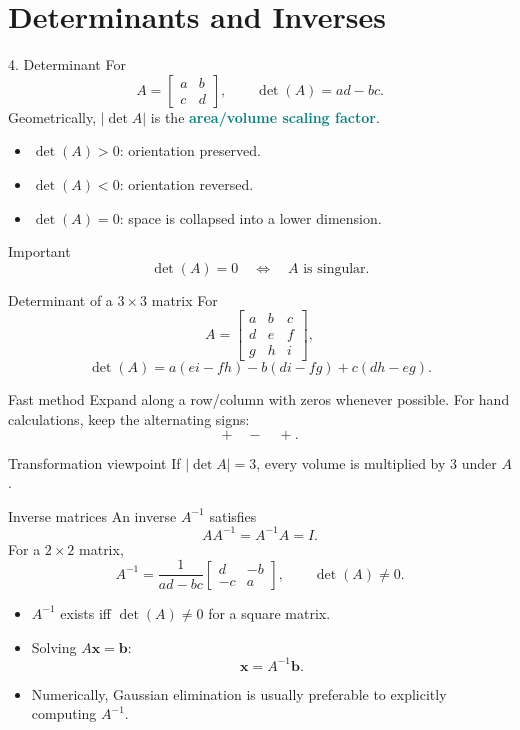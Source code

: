 \documentclass[aspectratio=169,11pt]{beamer}
\newcommand{\vect}[1]{\bm{#1}}
\newcommand{\important}[1]{\textcolor{teal}{\textbf{#1}}}
\begin{document}
\section{Determinants and Inverses}
\begin{frame}{4. Determinant}
For
\[
A=\begin{bmatrix}a&b\\c&d\end{bmatrix},
\qquad
\det(A)=ad-bc.
\]
Geometrically, $|\det A|$ is the \important{area/volume scaling factor}.
\begin{itemize}
\item $\det(A)>0$: orientation preserved.
\item $\det(A)<0$: orientation reversed.
\item $\det(A)=0$: space is collapsed into a lower dimension.
\end{itemize}
\begin{alertblock}{Important}
\[
\det(A)=0\quad\Longleftrightarrow\quad A\text{ is singular}.
\]
\end{alertblock}
\end{frame}

\begin{frame}{Determinant of a $3\times3$ matrix}
For
\[
A=
\begin{bmatrix}
a&b&c\\d&e&f\\g&h&i
\end{bmatrix},
\]
\[
\det(A)=
a(ei-fh)-b(di-fg)+c(dh-eg).
\]
\begin{exampleblock}{Fast method}
Expand along a row/column with zeros whenever possible. For hand calculations, keep the alternating signs:
\[
+\quad-\quad+.
\]
\end{exampleblock}
\begin{block}{Transformation viewpoint}
If $|\det A|=3$, every volume is multiplied by $3$ under $A$.
\end{block}
\end{frame}

\begin{frame}{Inverse matrices}
An inverse $A^{-1}$ satisfies
\[
AA^{-1}=A^{-1}A=I.
\]
For a $2\times2$ matrix,
\[
A^{-1}=
\frac{1}{ad-bc}
\begin{bmatrix}
d&-b\\-c&a
\end{bmatrix},
\qquad \det(A)\neq0.
\]
\begin{itemize}
\item $A^{-1}$ exists iff $\det(A)\neq0$ for a square matrix.
\item Solving $A\vect x=\vect b$:
\[
\vect x=A^{-1}\vect b.
\]
\item Numerically, Gaussian elimination is usually preferable to explicitly computing $A^{-1}$.
\end{itemize}
\end{frame}
\end{document}
